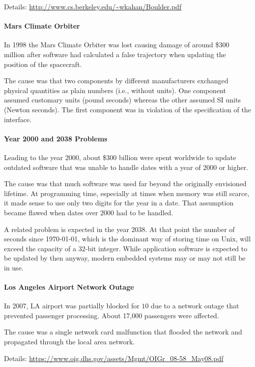 Details: \url{http://www.cs.berkeley.edu/~wkahan/Boulder.pdf}

\paragraph{Mars Climate Orbiter}
In 1998 the Mars Climate Orbiter was lost causing damage of around \$$300$ million after software had calculated a false trajectory when updating the position of the spacecraft.

The cause was that two components by different manufacturers exchanged physical quantities as plain numbers (i.e., without units).
One component assumed customary units (pound seconds) whereas the other assumed SI units (Newton seconds).
The first component was in violation of the specification of the interface.

\paragraph{Year 2000 and 2038 Problems}
Leading to the year 2000, about \$$300$ billion were spent worldwide to update outdated software that was unable to handle dates with a year of $2000$ or higher.

The cause was that much software was used far beyond the originally envisioned lifetime.
At programming time, especially at times when memory was still scarce, it made sense to use only two digits for the year in a date.
That assumption became flawed when dates over $2000$ had to be handled.

A related problem is expected in the year 2038.
At that point the number of seconds since 1970-01-01, which is the dominant way of storing time on Unix, will exceed the capacity of a $32$-bit integer.
While application software is expected to be updated by then anyway, modern embedded systems may or may not still be in use.

\paragraph{Los Angeles Airport Network Outage}
In 2007, LA airport was partially blocked for $10$ due to a network outage that prevented passenger processing.
About 17,000 passengers were affected.

The cause was a single network card malfunction that flooded the network and propagated through the local area network.

Details: \url{https://www.oig.dhs.gov/assets/Mgmt/OIGr_08-58_May08.pdf}

